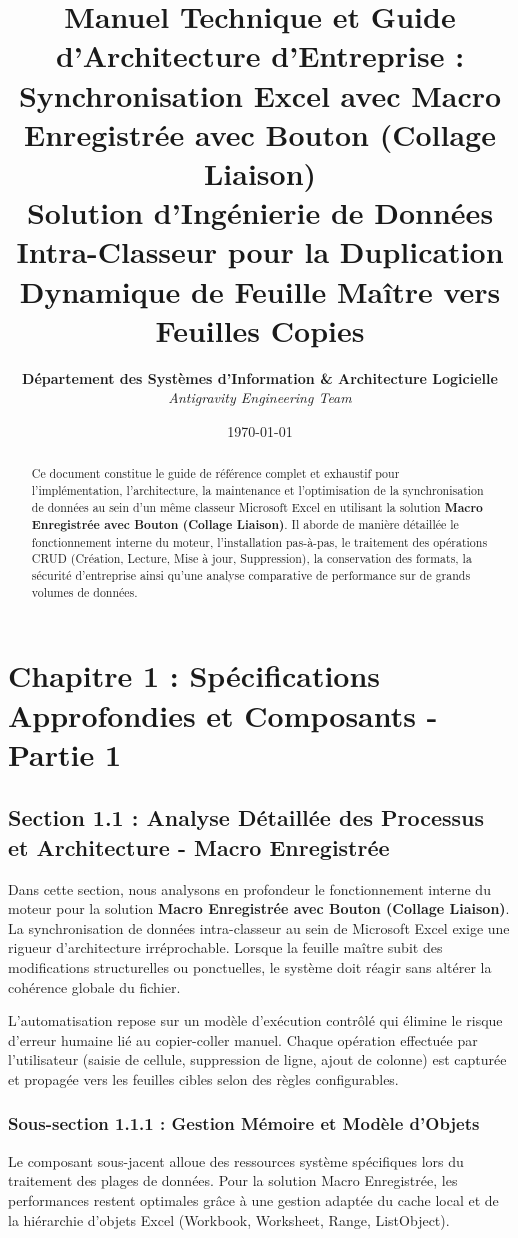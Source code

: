 \documentclass[12pt,a4paper]{report}
\title{\Huge \textbf{Manuel Technique et Guide d'Architecture d'Entreprise : Synchronisation Excel avec Macro Enregistrée avec Bouton (Collage Liaison)}\\[1.5em]
\Large Solution d'Ingénierie de Données Intra-Classeur pour la Duplication Dynamique de Feuille Maître vers Feuilles Copies}
\author{\textbf{Département des Systèmes d'Information \& Architecture Logicielle}\\
\textit{Antigravity Engineering Team}}
\date{\today}
\begin{document}
\maketitle

\begin{abstract}
Ce document constitue le guide de référence complet et exhaustif pour l'implémentation, l'architecture, la maintenance et l'optimisation de la synchronisation de données au sein d'un même classeur Microsoft Excel en utilisant la solution \textbf{Macro Enregistrée avec Bouton (Collage Liaison)}. Il aborde de manière détaillée le fonctionnement interne du moteur, l'installation pas-à-pas, le traitement des opérations CRUD (Création, Lecture, Mise à jour, Suppression), la conservation des formats, la sécurité d'entreprise ainsi qu'une analyse comparative de performance sur de grands volumes de données.
\end{abstract}

\tableofcontents
\newpage

\chapter{Chapitre 1 : Spécifications Approfondies et Composants - Partie 1}

\section{Section 1.1 : Analyse Détaillée des Processus et Architecture - Macro Enregistrée}
Dans cette section, nous analysons en profondeur le fonctionnement interne du moteur pour la solution \textbf{Macro Enregistrée avec Bouton (Collage Liaison)}. La synchronisation de données intra-classeur au sein de Microsoft Excel exige une rigueur d'architecture irréprochable. Lorsque la feuille maître subit des modifications structurelles ou ponctuelles, le système doit réagir sans altérer la cohérence globale du fichier.

L'automatisation repose sur un modèle d'exécution contrôlé qui élimine le risque d'erreur humaine lié au copier-coller manuel. Chaque opération effectuée par l'utilisateur (saisie de cellule, suppression de ligne, ajout de colonne) est capturée et propagée vers les feuilles cibles selon des règles configurables.


\subsection{Sous-section 1.1.1 : Gestion Mémoire et Modèle d'Objets}
Le composant sous-jacent alloue des ressources système spécifiques lors du traitement des plages de données. Pour la solution Macro Enregistrée, les performances restent optimales grâce à une gestion adaptée du cache local et de la hiérarchie d'objets Excel (Workbook, Worksheet, Range, ListObject).
\end{document}
